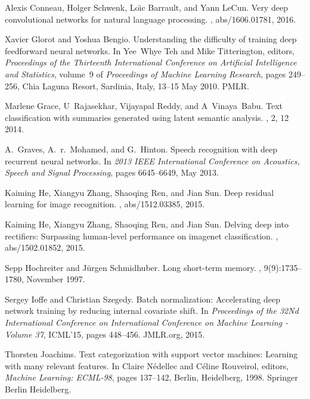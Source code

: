 \documentclass{article}
\begin{document}
\begin{thebibliography}{10}
Alexis Conneau, Holger Schwenk, Lo{\"{\i}}c Barrault, and Yann LeCun.
\newblock Very deep convolutional networks for natural language processing.
, abs/1606.01781, 2016.

Xavier Glorot and Yoshua Bengio.
\newblock Understanding the difficulty of training deep feedforward neural
  networks.
\newblock In Yee~Whye Teh and Mike Titterington, editors, {\em Proceedings of
  the Thirteenth International Conference on Artificial Intelligence and
  Statistics}, volume~9 of {\em Proceedings of Machine Learning Research},
  pages 249--256, Chia Laguna Resort, Sardinia, Italy, 13--15 May 2010. PMLR.

Marlene Grace, U~Rajasekhar, Vijayapal Reddy, and A~Vinaya~Babu.
\newblock Text classification with summaries generated using latent semantic
  analysis.
, 2, 12 2014.

A.~Graves, A.~r.~Mohamed, and G.~Hinton.
\newblock Speech recognition with deep recurrent neural networks.
\newblock In {\em 2013 IEEE International Conference on Acoustics, Speech and
  Signal Processing}, pages 6645--6649, May 2013.

Kaiming He, Xiangyu Zhang, Shaoqing Ren, and Jian Sun.
\newblock Deep residual learning for image recognition.
, abs/1512.03385, 2015.

Kaiming He, Xiangyu Zhang, Shaoqing Ren, and Jian Sun.
\newblock Delving deep into rectifiers: Surpassing human-level performance on
  imagenet classification.
, abs/1502.01852, 2015.

Sepp Hochreiter and J\"{u}rgen Schmidhuber.
\newblock Long short-term memory.
, 9(9):1735--1780, November 1997.

Sergey Ioffe and Christian Szegedy.
\newblock Batch normalization: Accelerating deep network training by reducing
  internal covariate shift.
\newblock In {\em Proceedings of the 32Nd International Conference on
  International Conference on Machine Learning - Volume 37}, ICML'15, pages
  448--456. JMLR.org, 2015.

Thorsten Joachims.
\newblock Text categorization with support vector machines: Learning with many
  relevant features.
\newblock In Claire N{\'e}dellec and C{\'e}line Rouveirol, editors, {\em
  Machine Learning: ECML-98}, pages 137--142, Berlin, Heidelberg, 1998.
  Springer Berlin Heidelberg.


\end{thebibliography}
\end{document}
